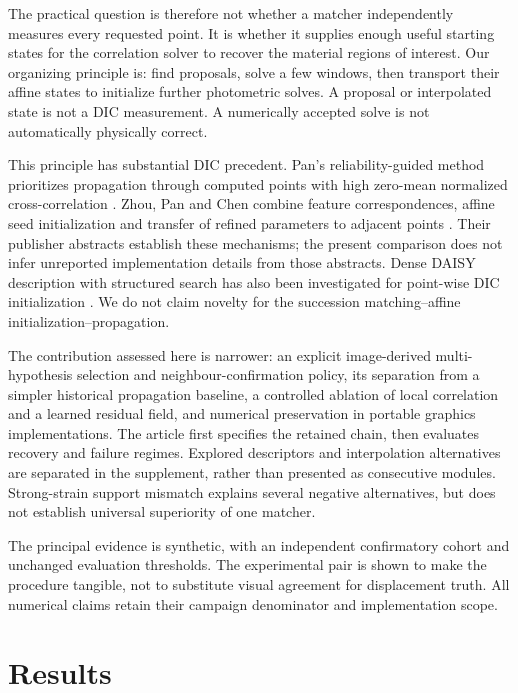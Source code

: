 \documentclass[11pt,a4paper]{article}
\begin{document}
The practical question is therefore not whether a matcher independently measures every requested point. It is whether it supplies enough useful starting states for the correlation solver to recover the material regions of interest. Our organizing principle is: find proposals, solve a few windows, then transport their affine states to initialize further photometric solves. A proposal or interpolated state is not a DIC measurement. A numerically accepted solve is not automatically physically correct.

This principle has substantial DIC precedent. Pan's reliability-guided method prioritizes propagation through computed points with high zero-mean normalized cross-correlation \citep{pan}. Zhou, Pan and Chen combine feature correspondences, affine seed initialization and transfer of refined parameters to adjacent points \citep{zhou}. Their publisher abstracts establish these mechanisms; the present comparison does not infer unreported implementation details from those abstracts. Dense DAISY description with structured search has also been investigated for point-wise DIC initialization \citep{li}. We do not claim novelty for the succession matching--affine initialization--propagation.

The contribution assessed here is narrower: an explicit image-derived multi-hypothesis selection and neighbour-confirmation policy, its separation from a simpler historical propagation baseline, a controlled ablation of local correlation and a learned residual field, and numerical preservation in portable graphics implementations. The article first specifies the retained chain, then evaluates recovery and failure regimes. Explored descriptors and interpolation alternatives are separated in the supplement, rather than presented as consecutive modules. Strong-strain support mismatch explains several negative alternatives, but does not establish universal superiority of one matcher.

The principal evidence is synthetic, with an independent confirmatory cohort and unchanged evaluation thresholds. The experimental pair is shown to make the procedure tangible, not to substitute visual agreement for displacement truth. All numerical claims retain their campaign denominator and implementation scope.





\section{Results}


\end{document}
